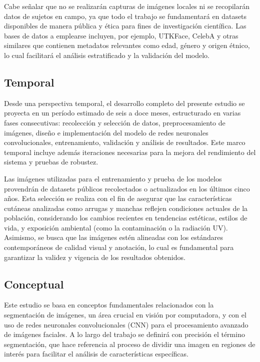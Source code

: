 Cabe señalar que no se realizarán capturas de imágenes locales ni se recopilarán datos de sujetos en campo, ya que todo el trabajo se fundamentará en datasets disponibles de manera pública y ética para fines de investigación científica. Las bases de datos a emplearse incluyen, por ejemplo, UTKFace, CelebA y otras similares que contienen metadatos relevantes como edad, género y origen étnico, lo cual facilitará el análisis estratificado y la validación del modelo.

\subsection{Temporal}

Desde una perspectiva temporal, el desarrollo completo del presente estudio se proyecta en un período estimado de seis a doce meses, estructurado en varias fases consecutivas: recolección y selección de datos, preprocesamiento de imágenes, diseño e implementación del modelo de redes neuronales convolucionales, entrenamiento, validación y análisis de resultados. Este marco temporal incluye además iteraciones necesarias para la mejora del rendimiento del sistema y pruebas de robustez.

Las imágenes utilizadas para el entrenamiento y prueba de los modelos provendrán de datasets públicos recolectados o actualizados en los últimos cinco años. Esta selección se realiza con el fin de asegurar que las características cutáneas analizadas como arrugas y manchas reflejen condiciones actuales de la población, considerando los cambios recientes en tendencias estéticas, estilos de vida, y exposición ambiental (como la contaminación o la radiación UV). Asimismo, se busca que las imágenes estén alineadas con los estándares contemporáneos de calidad visual y anotación, lo cual es fundamental para garantizar la validez y vigencia de los resultados obtenidos.

\subsection{Conceptual}

Este estudio se basa en conceptos fundamentales relacionados con la segmentación de imágenes, un área crucial en visión por computadora, y con el uso de redes neuronales convolucionales (CNN) para el procesamiento avanzado de imágenes faciales. A lo largo del trabajo se definirá con precisión el término segmentación, que hace referencia al proceso de dividir una imagen en regiones de interés para facilitar el análisis de características específicas.

